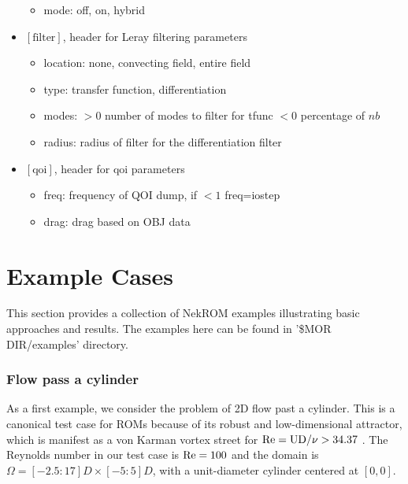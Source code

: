 \begin{itemize}
   \begin{itemize}
      \item mode: off, on, hybrid
   \end{itemize}
\item $[\text{filter}]$, header for Leray filtering parameters \cite{kaneko2020towards}\cite{tsai2022parametric}
   \begin{itemize}
      \item location: none, convecting field, entire field
      \item type: transfer function, differentiation
      \item modes: $>0$ number of modes to filter for tfunc $<0$ percentage of $nb$
      \item radius: radius of filter for the differentiation filter 
   \end{itemize}
\item $[\text{qoi}]$, header for qoi parameters
   \begin{itemize}
    \item freq: frequency of QOI dump, if $<1$ freq=iostep
    \item drag: drag based on OBJ data
   \end{itemize}
\end{itemize}

\newpage

\section{Example Cases}

\noindent
This section provides a collection of NekROM examples illustrating basic
approaches and results. The examples here can be found in '\$MOR DIR/examples'
directory.

\subsubsection{Flow pass a cylinder}

\noindent
As a first example, we consider the problem of 2D flow past a cylinder. 
This is a canonical test case for ROMs because of its robust and
low-dimensional attractor, which is manifest as a von Karman vortex street 
for $\rm Re = UD/\nu
>34.37$ \cite{ding2021flow}. The Reynolds number in our test case is $\rm
Re = 100$ and the domain is 
$\Omega = [-2.5 : 17]D \times [-5 : 5]D$, with a
unit-diameter cylinder centered at $[0, 0]$.

